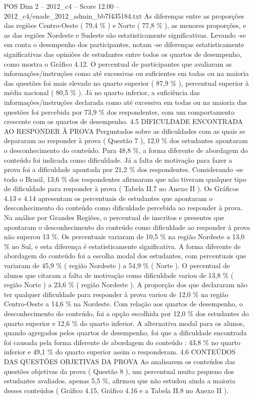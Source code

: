 \begin{textsample}{POS Dim 2 – 2012\_c4 – Score 12.00 – 2012\_c4/enade\_2012\_admin\_bb7f435184.txt}
As diferenças entre as proporções das regiões Centro-Oeste ( 79,4 \% ) e Norte ( 77,8 \% ), as menores proporções, e as das regiões Nordeste e Sudeste são estatisticamente significativas.
Levando -se em conta o desempenho dos participantes, notam -se diferenças estatisticamente significativas das opiniões de estudantes entre todos os quartos de desempenho, como mostra o Gráfico 4.12.
O percentual de participantes que avaliaram as informações/instruções como até excessivas ou suficientes em todas ou na maioria das questões foi mais elevado no quarto superior ( 87,9 \% ), percentual superior à média nacional ( 80,5 \% ).
Já no quarto inferior, a suficiência das informações/instruções declarada como até excessiva em todas ou na maioria das questões foi percebida por 73,9 \% dos respondentes, com um comportamento crescente com os quartos de desempenho. 4.5 DIFICULDADE ENCONTRADA AO RESPONDER À PROVA Perguntados sobre as dificuldades com as quais se depararam ao responder à prova ( Questão 7 ), 12,0 \% dos estudantes apontaram o desconhecimento do conteúdo.
Para 48,8 \%, a forma diferente de abordagem do conteúdo foi indicada como dificuldade.
Já a falta de motivação para fazer a prova foi a dificuldade apontada por 21,2 \% dos respondentes.
Considerando -se todo o Brasil, 13,6 \% dos respondentes afirmaram que não tiveram qualquer tipo de dificuldade para responder à prova ( Tabela II.7 no Anexo II ).
Os Gráficos 4.13 e 4.14 apresentam os percentuais de estudantes que apontaram o desconhecimento do conteúdo como dificuldade percebida ao responder à prova.
Na análise por Grandes Regiões, o percentual de inscritos e presentes que apontaram o desconhecimento do conteúdo como dificuldade ao responder à prova não superou 13 \%.
Os percentuais variaram de 10,5 \% na região Nordeste a 13,0 \% no Sul, e esta diferença é estatisticamente significativa.
A forma diferente de abordagem do conteúdo foi a escolha modal dos estudantes, com percentuais que variaram de 45,9 \% ( região Nordeste ) a 54,9 \% ( Norte ).
O percentual de alunos que citaram a falta de motivação como dificuldade variou de 13,8 \% ( região Norte ) a 23,6 \% ( região Nordeste ).
A proporção dos que declararam não ter qualquer dificuldade para responder à prova variou de 12,0 \% na região Centro-Oeste a 14,6 \% na Nordeste.
Com relação aos quartos de desempenho, o desconhecimento do conteúdo, foi a opção escolhida por 12,0 \% dos estudantes do quarto superior e 12,6 \% do quarto inferior.
A alternativa modal para os alunos, quando agregados pelos quartos de desempenho, foi que a dificuldade encontrada foi causada pela forma diferente de abordagem do conteúdo : 43,8 \% no quarto inferior e 49,1 \% do quarto superior assim o responderam. 4.6 CONTEÚDOS DAS QUESTÕES OBJETIVAS DA PROVA Ao analisarem os conteúdos das questões objetivas da prova ( Questão 8 ), um percentual muito pequeno dos estudantes avaliados, apenas 5,5 \%, afirmou que não estudou ainda a maioria desses conteúdos ( Gráfico 4.15, Gráfico 4.16 e a Tabela II.8 no Anexo II ).

\end{textsample}
